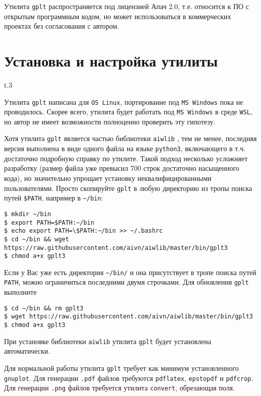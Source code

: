 \documentclass[12pt]{article}
\def\gplt{{\tt gplt}}
\def\gnuplot{{\tt gnuplot}}
\def\python{{\tt python3}}
\def\png{{\tt .png}}
\def\pdf{{\tt .pdf}}
\begin{document}
Утилита \gplt{} распространяется под лицензией Апач 2.0, т.е. относится к ПО с открытым программным кодом, но может использоваться в коммерческих проектах
без согласования с автором.

\section{Установка  и настройка утилиты}
\begin{wrapfigure}{t}{.3\textwidth}
  \vphantom{.}
  \vspace{-3cm}

\end{wrapfigure}
Утилита \gplt{} написана для \verb'OS Linux', портирование под \verb'MS Windows' пока не проводилось. Скорее всего, утилита будет работать
под \verb'MS Windows' в среде \verb'WSL', но автор не имеет возможности полноценно проверить эту гипотезу.

Хотя утилита \gplt{} является частью библиотеки \verb'aiwlib' \cite{aiwlib:SR:PP2018,aiwlib:SV2018,aiwlib:git},
тем не менее, последняя версия выполнена в виде одного файла на языке \python, включающего в т.ч. достаточно подробную справку по утилите.
Такой подход несколько усложняет разработку (размер файла уже превысил 700 строк достаточно насыщенного кода), но значительно упрощает установку
неквалифицированными пользователями. Просто скопируйте \gplt{} в любую директорию из тропы поиска путей \verb'$PATH', например в \verb'~/bin':
\begin{verbatim}
$ mkdir ~/bin
$ export PATH=$PATH:~/bin
$ echo export PATH=\$PATH:~/bin >> ~/.bashrc
$ cd ~/bin && wget https://raw.githubusercontent.com/aivn/aiwlib/master/bin/gplt3 
$ chmod a+x gplt3
\end{verbatim}
Если у Вас уже есть директория \verb'~/bin/' и она присутствует в тропе поиска путей \verb'PATH', можно ограничиться последними двумя строчками.
Для обновления \gplt{} выполните
\begin{verbatim}
$ cd ~/bin && rm gplt3
$ wget https://raw.githubusercontent.com/aivn/aiwlib/master/bin/gplt3 
$ chmod a+x gplt3
\end{verbatim}

При установке библиотеки \verb'aiwlib' утилита \gplt{} будет установлена автоматически.

Для нормальной работы утилита \gplt{} требует как минимум установленного \gnuplot. Для генерации \pdf{} файлов требуются \verb'pdflatex', \verb'epstopdf'
и \verb'pdfcrop'. Для генерации \png{} файлов требуется утилита \verb'convert', обрезающая поля.
\end{document}

